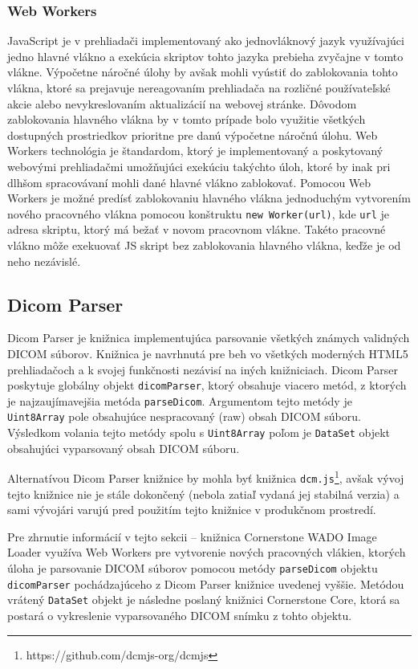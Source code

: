 \subsubsection {Web Workers}
JavaScript je v prehliadači implementovaný ako jednovláknový jazyk využívajúci jedno hlavné vlákno a exekúcia skriptov tohto jazyka prebieha zvyčajne v tomto vlákne. Výpočetne náročné úlohy by avšak mohli vyústiť do zablokovania tohto vlákna, ktoré sa prejavuje nereagovaním prehliadača na rozličné používateľské akcie alebo nevykreslovaním aktualizácií na webovej stránke. Dôvodom zablokovania hlavného vlákna by v tomto prípade bolo využitie všetkých dostupných prostriedkov prioritne pre danú výpočetne náročnú úlohu. \newline
Web Workers technológia je štandardom, ktorý je implementovaný a poskytovaný webovými prehliadačmi umožňujúci exekúciu takýchto úloh, ktoré by inak pri dlhšom spracovávaní mohli dané hlavné vlákno zablokovať. Pomocou Web Workers je možné predísť zablokovaniu hlavného vlákna jednoduchým vytvorením nového pracovného vlákna pomocou konštruktu \texttt{new Worker(url)}, kde \texttt{url} je adresa skriptu, ktorý má bežať v novom pracovnom vlákne. Takéto pracovné vlákno môže exekuovať JS skript bez zablokovania hlavného vlákna, keďže je od neho nezávislé. 

\subsection {Dicom Parser}
Dicom Parser je knižnica implementujúca parsovanie všetkých známych validných DICOM súborov. Knižnica je navrhnutá pre beh vo všetkých moderných HTML5 prehliadačoch a k svojej funkčnosti nezávisí na iných knižniciach. Dicom Parser poskytuje globálny objekt \texttt{dicomParser}, ktorý obsahuje viacero metód, z ktorých je najzaujímavejšia metóda \texttt{parseDicom}. Argumentom tejto metódy je \texttt{Uint8Array} pole obsahujúce nespracovaný (raw) obsah DICOM súboru. Výsledkom volania tejto metódy spolu s \texttt{Uint8Array} poľom je \texttt{DataSet} objekt obsahujúci vyparsovaný obsah DICOM súboru.

Alternatívou Dicom Parser knižnice by mohla byť knižnica \texttt{dcm.js}\footnote{https://github.com/dcmjs-org/dcmjs}, avšak vývoj tejto knižnice nie je stále dokončený (nebola zatiaľ vydaná jej stabilná verzia) a sami vývojári varujú pred použitím tejto knižnice v produkčnom prostredí. 

Pre zhrnutie informácií v tejto sekcii -- knižnica Cornerstone WADO Image Loader využíva Web Workers pre vytvorenie nových pracovných vlákien, ktorých úloha je parsovanie DICOM súborov pomocou metódy \texttt{parseDicom} objektu \texttt{dicomParser} pochádzajúceho z Dicom Parser knižnice uvedenej vyššie. Metódou vrátený \texttt{DataSet} objekt je následne poslaný knižnici Cornerstone Core, ktorá sa postará o vykreslenie vyparsovaného DICOM snímku z tohto objektu.

